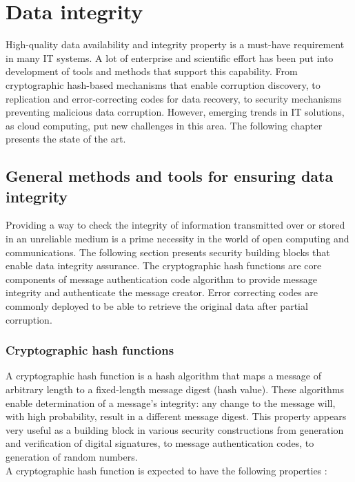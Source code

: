 \chapter{Data integrity}
\label{cha:state_of_the_art}
High-quality data availability and integrity property is a must-have
requirement in many IT systems. A lot of enterprise and scientific effort
has been put into development of tools and methods that support this capability.
From cryptographic hash-based mechanisms that enable corruption discovery, to
replication and error-correcting codes for data recovery, to security
mechanisms preventing malicious data corruption. However, emerging trends in IT
solutions, as cloud computing, put new challenges in this area. The following
chapter presents the state of the art.

	\section{General methods and tools for ensuring data integrity}
	\label{classic-integrity-methods}
Providing a way to check the integrity of information transmitted over or
stored in an unreliable medium is a prime necessity in the world of open
computing and communications. The following section presents security building
blocks that enable data integrity assurance. The cryptographic hash functions
are core components of message authentication code algorithm to provide message
integrity and authenticate the message creator. Error correcting codes are 
commonly deployed to be able to retrieve the original data after partial
corruption.
 
		\subsection{Cryptographic hash functions}
A cryptographic hash function is a hash algorithm that maps a message of
arbitrary length to a fixed-length message digest (hash value). These
algorithms enable determination of a message's integrity: any change to the
message will, with high probability, result in a different message digest.
This property appears very useful as a building block in various security
constructions from generation and verification of digital signatures, to
message authentication codes, to generation of random numbers.\\ 

A cryptographic hash function is expected to have the following properties
\cite{nist-hash}:\\

